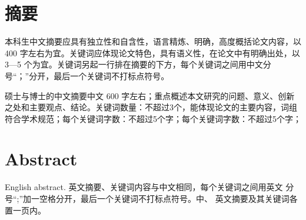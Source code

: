 \chapter*{摘要}

本科生中文摘要应具有独立性和自含性，语言精炼、明确，高度概括论文内容，以 400 字左右为宜。关键词应体现论文特色，具有语义性，在论文中有明确出处，以 3—5 个为宜。关键词另起一行排在摘要的下方，每个关键词之间用中文分号“；”分开，最后一个关键词不打标点符号。

硕士与博士的中文摘要中文 600 字左右；重点概述本文研究的问题、意义、创新之处和主要观点、结论。关键词数量：不超过3个，能体现论文的主要内容，词组符合学术规范；每个关键词字数：不超过5个字；每个关键词字数：不超过5个字；



\chapter*{\bfseries Abstract}

English abstract. 英文摘要、关键词内容与中文相同，每个关键词之间用英文
分号“;”加一空格分开，最后一个关键词不打标点符号。中、
英文摘要及其关键词各置一页内。

